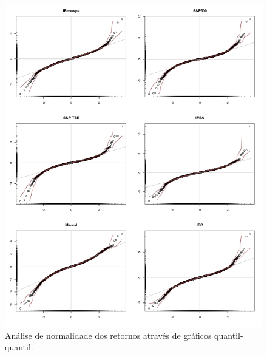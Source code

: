\documentclass[1p]{elsarticle}
\theoremstyle{definition}
\begin{document}
\begin{figure}[H]
	\centering
	\includegraphics[width=1\linewidth]{figs/artigo-qqplots}
	\caption{Análise de normalidade dos retornos através de gráficos quantil-quantil.}
	\label{fig:artigo-qqplots}
\end{figure}
\end{document}
